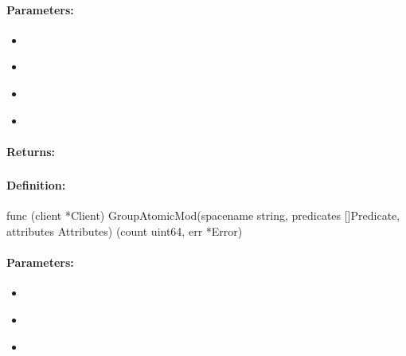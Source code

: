 \paragraph{Parameters:}
\begin{itemize}[noitemsep]
\item {}\\

\item {}\\

\item {}\\

\item {}\\

\end{itemize}

\paragraph{Returns:}


\pagebreak
\subsubsection{}
\label{api:Go:GroupAtomicMod}


\paragraph{Definition:}
\begin{gocode}
func (client *Client) GroupAtomicMod(spacename string, predicates []Predicate, attributes Attributes) (count uint64, err *Error)
\end{gocode}

\paragraph{Parameters:}
\begin{itemize}[noitemsep]
\item {}\\

\item {}\\

\item {}\\

\end{itemize}

